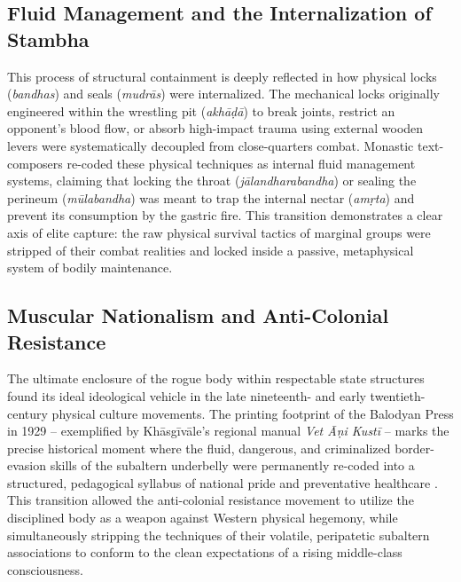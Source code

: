 \documentclass[11pt,twoside,letterpaper]{article}
\begin{document}
\subsection{Fluid Management and the Internalization of Stambha}
This process of structural containment is deeply reflected in how physical locks (\textit{bandhas}) and seals (\textit{mudrās}) were internalized. The mechanical locks originally engineered within the wrestling pit (\textit{akhāḍā}) to break joints, restrict an opponent's blood flow, or absorb high-impact trauma using external wooden levers were systematically decoupled from close-quarters combat. Monastic text-composers re-coded these physical techniques as internal fluid management systems, claiming that locking the throat (\textit{jālandharabandha}) or sealing the perineum (\textit{mūlabandha}) was meant to trap the internal nectar (\textit{amṛta}) and prevent its consumption by the gastric fire. This transition demonstrates a clear axis of elite capture: the raw physical survival tactics of marginal groups were stripped of their combat realities and locked inside a passive, metaphysical system of bodily maintenance.

\subsection{Muscular Nationalism and Anti-Colonial Resistance}
The ultimate enclosure of the rogue body within respectable state structures found its ideal ideological vehicle in the late nineteenth- and early twentieth-century physical culture movements. The printing footprint of the Balodyan Press in 1929 -- exemplified by Khāsgīvāle’s regional manual \textit{Vet Āṇi Kustī} -- marks the precise historical moment where the fluid, dangerous, and criminalized border-evasion skills of the subaltern underbelly were permanently re-coded into a structured, pedagogical syllabus of national pride and preventative healthcare \citep{Khasgivale1929}. This transition allowed the anti-colonial resistance movement to utilize the disciplined body as a weapon against Western physical hegemony, while simultaneously stripping the techniques of their volatile, peripatetic subaltern associations to conform to the clean expectations of a rising middle-class consciousness.
\end{document}
